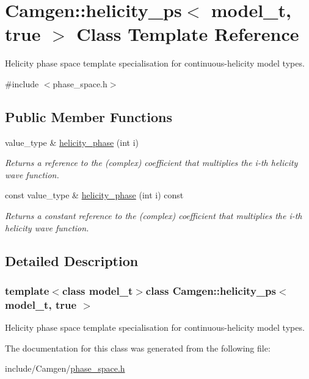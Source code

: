 \hypertarget{a00274}{\section{Camgen\-:\-:helicity\-\_\-ps$<$ model\-\_\-t, true $>$ Class Template Reference}
\label{a00274}
}


Helicity phase space template specialisation for continuous-\/helicity model types.  




{\ttfamily \#include $<$phase\-\_\-space.\-h$>$}

\subsection*{Public Member Functions}
\begin{DoxyCompactItemize}
\item 
\hypertarget{a00274_a0bc312487ff58cb1f19cd60a58cc666c}{value\-\_\-type \& \hyperlink{a00274_a0bc312487ff58cb1f19cd60a58cc666c}{helicity\-\_\-phase} (int i)}\label{a00274_a0bc312487ff58cb1f19cd60a58cc666c}

\begin{DoxyCompactList}\small\item\em Returns a reference to the (complex) coefficient that multiplies the i-\/th helicity wave function. \end{DoxyCompactList}\item 
\hypertarget{a00274_ab7781a7dac360c05e1b74db7f04a5ed3}{const value\-\_\-type \& \hyperlink{a00274_ab7781a7dac360c05e1b74db7f04a5ed3}{helicity\-\_\-phase} (int i) const }\label{a00274_ab7781a7dac360c05e1b74db7f04a5ed3}

\begin{DoxyCompactList}\small\item\em Returns a constant reference to the (complex) coefficient that multiplies the i-\/th helicity wave function. \end{DoxyCompactList}\end{DoxyCompactItemize}


\subsection{Detailed Description}
\subsubsection*{template$<$class model\-\_\-t$>$class Camgen\-::helicity\-\_\-ps$<$ model\-\_\-t, true $>$}

Helicity phase space template specialisation for continuous-\/helicity model types. 



The documentation for this class was generated from the following file\-:\begin{DoxyCompactItemize}
\item 
include/\-Camgen/\hyperlink{a00694}{phase\-\_\-space.\-h}\end{DoxyCompactItemize}
